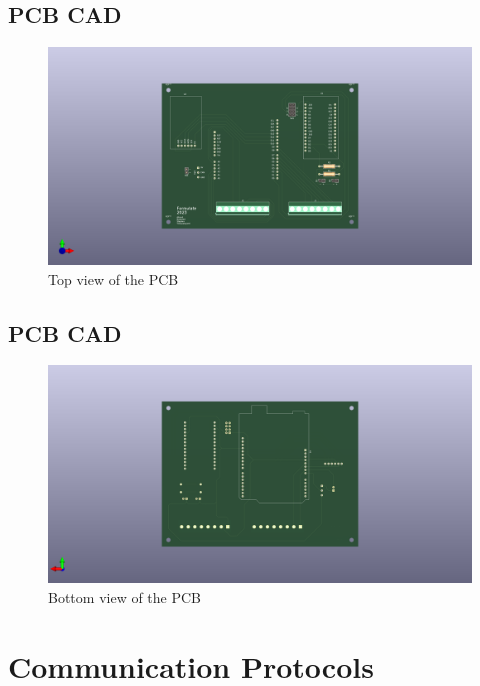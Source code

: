 \documentclass[12pt, titlepage]{article}
\begin{document}
\subsection{PCB CAD}
\begin{figure}[h!]
  \begin{center}
  \includegraphics[width=1.1\textwidth]{PCB_Front_View}
  \caption{Top view of the PCB}
  \end{center}
  \end{figure}
  \newpage

\subsection{PCB CAD}
\begin{figure}[h!]
  \begin{center}
  \includegraphics[width=1.1\textwidth]{PCB_Back_View}
  \caption{Bottom view of the PCB}
  \end{center}
  \end{figure}
  \newpage

\section{Communication Protocols}
\end{document}
